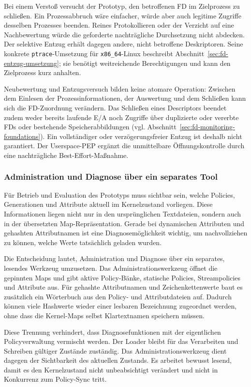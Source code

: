 Bei einem Verstoß versucht der Prototyp, den betroffenen FD im Zielprozess zu schließen. Ein Prozessabbruch wäre einfacher, würde aber auch legitime Zugriffe desselben Prozesses beenden. Reines Protokollieren oder der Verzicht auf eine Nachbewertung würde die geforderte nachträgliche Durchsetzung nicht abdecken. Der selektive Entzug erhält dagegen andere, nicht betroffene Deskriptoren. Seine konkrete \texttt{ptrace}-Umsetzung für \texttt{x86\_64}-Linux beschreibt Abschnitt~\ref{sec:fd-entzug-umsetzung}; sie benötigt weitreichende Berechtigungen und kann den Zielprozess kurz anhalten.

Neubewertung und Entzugsversuch bilden keine atomare Operation: Zwischen dem Einlesen der Prozessinformationen, der Auswertung und dem Schließen kann sich die FD-Zuordnung verändern. Das Schließen eines Descriptors beendet zudem weder bereits laufende E/A noch Zugriffe über duplizierte oder vererbte FDs oder bestehende Speicherabbildungen (vgl. Abschnitt~\ref{sec:fd-monitoring-foundations}). Ein vollständiger oder verzögerungsfreier Entzug ist deshalb nicht garantiert. Der Userspace-PEP ergänzt die unmittelbare Öffnungskontrolle durch eine nachträgliche Best-Effort-Maßnahme.

\subsubsection{Administration und Diagnose über ein separates Tool}
Für Betrieb und Evaluation des Prototyps muss sichtbar sein, welche Policies, Generationen und Attribute aktuell im Kernelzustand vorliegen.
Diese Informationen liegen nicht nur in den ursprünglichen Textdateien, sondern auch in der übersetzten Map-Repräsentation.
Gerade bei dynamischen Attributen und gehashten Attributnamen ist eine Diagnosemöglichkeit wichtig, um nachvollziehen zu können, welche Werte tatsächlich geladen wurden.

Die Entscheidung lautet, Administration und Diagnose über ein separates, lesendes Werkzeug umzusetzen.
Das Administrationswerkzeug öffnet die gepinnten Maps und gibt aktive Policy-Bänke, statische Policies, Streampolicies und Attribute aus.
Für gehashte Attributnamen und Zeichenkettenwerte baut es zusätzlich ein Wörterbuch aus den Policy- und Attributdateien auf.
Dadurch können viele Hashwerte wieder einer lesbaren Bezeichnung zugeordnet werden, ohne dass die Kernel-Maps selbst Klartextnamen speichern müssen.

Diese Trennung verhindert, dass Diagnosefunktionen mit der eigentlichen Policyverwaltung vermischt werden.
Der Loader bleibt für das Verarbeiten und Schreiben gültiger Zustände zuständig.
Das Administrationswerkzeug dient dagegen der Sichtbarkeit des aktuellen Zustands.
Es arbeitet bewusst lesend, damit es den Kernelzustand nicht unbeabsichtigt verändert und nicht in Konkurrenz zum Policy-Sync tritt.

